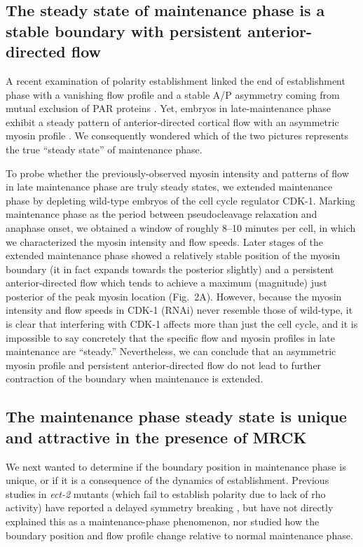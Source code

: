 \documentclass[11pt]{article}
\newcommand{\6}[1]{#1_{\text{6}}}
\newcommand{\3}[1]{#1_{\text{3}}}
\begin{document}
\subsection*{The steady state of maintenance phase is a stable boundary with persistent anterior-directed flow}
A recent examination of polarity establishment linked the end of establishment phase with a vanishing flow profile and a stable A/P asymmetry coming from mutual exclusion of PAR proteins \citep{gross2019guiding}. Yet, embryos in late-maintenance phase exhibit a steady pattern of anterior-directed cortical flow with an asymmetric myosin profile \citep[Fig.~2]{sailer2015dynamic}. We consequently wondered which of the two pictures represents the true ``steady state'' of maintenance phase.  

To probe whether the previously-observed myosin intensity and patterns of flow in late maintenance phase are truly steady states, we extended maintenance phase by depleting wild-type embryos of the cell cycle regulator CDK-1. Marking maintenance phase as the period between pseudocleavage relaxation and anaphase onset, we obtained a window of roughly 8--10 minutes per cell, in which we characterized the myosin intensity and flow speeds. Later stages of the extended maintenance phase showed a relatively stable position of the myosin boundary (it in fact expands towards the posterior slightly) and a persistent anterior-directed flow which tends to achieve a maximum (magnitude) just posterior of the peak myosin location (Fig.\ 2A). However, because the myosin intensity and flow speeds in CDK-1 (RNAi) never resemble those of wild-type, it is clear that interfering with CDK-1 affects more than just the cell cycle, and it is impossible to say concretely that the specific flow and myosin profiles in late maintenance are ``steady.'' Nevertheless, we can conclude that an asymmetric myosin profile and persistent anterior-directed flow do not lead to further contraction of the boundary when maintenance is extended.

\subsection*{The maintenance phase steady state is unique and attractive in the presence of MRCK}
We next wanted to determine if the boundary position in maintenance phase is unique, or if it is a consequence of the dynamics of establishment. Previous studies in \emph{ect-2} mutants (which fail to establish polarity due to lack of rho activity) have reported a delayed symmetry breaking \citep{zonies2010symmetry, tse2012rhoa}, but have not directly explained this as a maintenance-phase phenomenon, nor studied how the boundary position and flow profile change relative to normal maintenance phase. 
\end{document}
